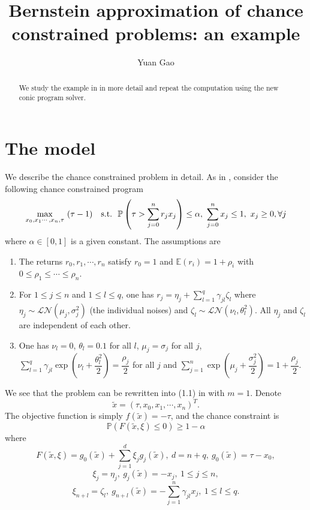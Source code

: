 \documentclass[11pt]{article}
\title{Bernstein approximation of chance constrained problems: an example}
\author{Yuan Gao}
\begin{document}
\maketitle

\begin{abstract}
We study the example in\cite{Nemirovsky_and_Shapiro} in more detail and repeat the computation using the new conic program solver.
\end{abstract}

\section*{The model}
We describe the chance constrained problem in detail. As in \cite{Nemirovsky_and_Shapiro}, consider the following chance constrained program
\begin{align} \label{investment_problem}
\max_{x_0, x_1\cdots,x_n, \tau}\ (\tau - 1)\ \ \ \textnormal{s.t.}\ \ \mathbb{P} \left(\tau > \sum_{j=0}^n r_j x_j \right) \leq \alpha,\ \sum_{j=0}^{n} x_j \leq 1,\ x_j \geq 0, \forall j
\end{align}
where $\alpha \in [0,1]$ is a given constant. The assumptions are 
\begin{enumerate}
	\item The returns $r_0, r_1, \cdots, r_n$ satisfy $r_0=1$ and $\mathbb{E}(r_i) = 1 + \rho_i$ with $0\leq \rho_1 \leq \cdots \leq \rho_n$.
	\item For $1\leq j \leq n$ and $1\leq l \leq q$, one has $r_j = \eta_j + \sum_{l=1}^q \gamma_{jl}\zeta_l$ where $\eta_j \sim \mathcal{LN}(\mu_j, \sigma_j^2)$ (the individual noises) and $\zeta_l \sim \mathcal{LN}(\nu_l, \theta_l^2)$. All $\eta_j$ and $\zeta_l$ are independent of each other.
	\item One has $\nu_l = 0$, $\theta_l=0.1$ for all $l$, $\mu_j = \sigma_j$ for all $j$, $\sum_{l=1}^q \gamma_{jl} \exp \left(\nu_l + \dfrac{\theta_l^2}{2}\right) = \dfrac{\rho_j}{2}$ for all $j$ and $\sum_{j=1}^n \exp\left(\mu_j + \dfrac{\sigma_j^2}{2}\right) = 1 + \dfrac{\rho_j}{2}$.
\end{enumerate}
We see that the problem can be rewritten into (1.1) in \cite{Nemirovsky_and_Shapiro} with $m=1$. Denote \[\tilde{x} = (\tau, x_0, x_1, \cdots, x_n)^T.\] The objective function is simply $f(\tilde{x}) = -\tau$, and the chance constraint is \[\mathbb{P}\left(F(\tilde{x}, \xi) \leq 0 \right) \geq 1-\alpha\] where \[F(\tilde{x},\xi) =g_0(\tilde{x}) + \sum_{j=1}^d \xi_j g_j(\tilde{x}),\ d = n+q,\ g_0(\tilde{x}) = \tau - x_0,\]
\[\xi_j = \eta_j,\ g_j(\tilde{x}) = -x_j,\ 1\leq j \leq n,\] \[\xi_{n+l} = \zeta_l,\ g_{n+l}(\tilde{x}) = -\sum_{j=1}^n \gamma_{jl}x_j,\ 1\leq l \leq q.\]
\end{document}
